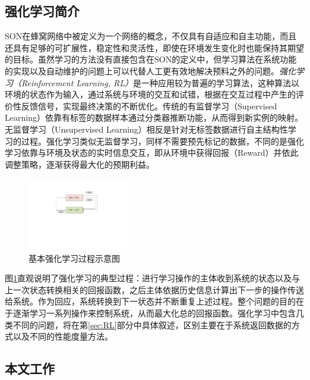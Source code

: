 ﻿\documentclass[11pt,draftclsnofoot,onecolumn,journal,letterpaper]{IEEEtran}
\begin{document}
\subsection{强化学习简介}


SON在蜂窝网络中被定义为一个网络的概念，不仅具有自适应和自主功能，而且还具有足够的可扩展性，稳定性和灵活性，即使在环境发生变化时也能保持其期望的目标。虽然学习的方法没有直接包含在SON的定义中，但学习算法在系统功能的实现以及自动维护的问题上可以代替人工更有效地解决预料之外的问题。\emph{强化学习（Reinforcement Learning, RL）}是一种应用较为普遍的学习算法，这种算法以环境的状态作为输入，通过系统与环境的交互和试错，根据在交互过程中产生的评价性反馈信号，实现最终决策的不断优化。传统的有监督学习（Supervised Learning）依靠有标签的数据样本通过分类器推断功能，从而得到新实例的映射。无监督学习（Unsupervised Learning）相反是针对无标签数据进行自主结构性学习的过程。强化学习类似无监督学习，同样不需要预先标记的数据，不同的是强化学习依靠与环境及状态的实时信息交互，即从环境中获得回报（Reward）并依此调整策略，逐渐获得最大化的预期利益。
\begin{figure}%
\centerline{\includegraphics[width=0.4\textwidth]{reinforcement.pdf}}
\caption{基本强化学习过程示意图}
\label{fig:rein}
\end{figure}
图\ref{fig:rein}直观说明了强化学习的典型过程：进行学习操作的主体收到系统的状态以及与上一次状态转换相关的回报函数，之后主体依据历史信息计算出下一步的操作传送给系统。作为回应，系统转换到下一状态并不断重复上述过程。整个问题的目的在于逐渐学习一系列操作来控制系统，从而最大化总的回报函数。强化学习中包含几类不同的问题，将在第\ref{sec:RL}部分中具体叙述，区别主要在于系统返回数据的方式以及不同的性能度量方法。


\subsection{本文工作}
\end{document}
